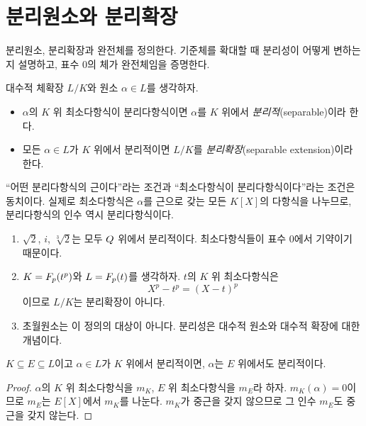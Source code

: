 \section{분리원소와 분리확장}
\label{sec:separable-extensions}

\begin{learninggoal}
분리원소, 분리확장과 완전체를 정의한다. 기준체를 확대할 때 분리성이 어떻게 변하는지 설명하고, 표수 $0$의 체가 완전체임을 증명한다.
\end{learninggoal}

\begin{definition}
대수적 체확장 $L/K$와 원소 $\alpha\in L$를 생각하자.
\begin{itemize}
  \item $\alpha$의 $K$ 위 최소다항식이 분리다항식이면 $\alpha$를 $K$ 위에서 \emph{분리적}(separable)이라 한다.
  \item 모든 $\alpha\in L$가 $K$ 위에서 분리적이면 $L/K$를 \emph{분리확장}(separable extension)이라 한다.
\end{itemize}
\end{definition}

``어떤 분리다항식의 근이다''라는 조건과 ``최소다항식이 분리다항식이다''라는 조건은 동치이다. 실제로 최소다항식은 $\alpha$를 근으로 갖는 모든 $K[X]$의 다항식을 나누므로, 분리다항식의 인수 역시 분리다항식이다.

\begin{example}
\begin{enumerate}[label=(\alph*)]
  \item $\sqrt2$, $i$, $\sqrt[3]{2}$는 모두 $Q$ 위에서 분리적이다. 최소다항식들이 표수 $0$에서 기약이기 때문이다.
  \item $K=F_p(t^p)$와 $L=F_p(t)$를 생각하자. $t$의 $K$ 위 최소다항식은
  \[
    X^p-t^p=(X-t)^p
  \]
  이므로 $L/K$는 분리확장이 아니다.
  \item 초월원소는 이 정의의 대상이 아니다. 분리성은 대수적 원소와 대수적 확장에 대한 개념이다.
\end{enumerate}
\end{example}

\begin{proposition}[기준체 확대]
$K\subseteq E\subseteq L$이고 $\alpha\in L$가 $K$ 위에서 분리적이면, $\alpha$는 $E$ 위에서도 분리적이다.
\end{proposition}

\begin{proof}
$\alpha$의 $K$ 위 최소다항식을 $m_K$, $E$ 위 최소다항식을 $m_E$라 하자. $m_K(\alpha)=0$이므로 $m_E$는 $E[X]$에서 $m_K$를 나눈다. $m_K$가 중근을 갖지 않으므로 그 인수 $m_E$도 중근을 갖지 않는다.
\end{proof}

